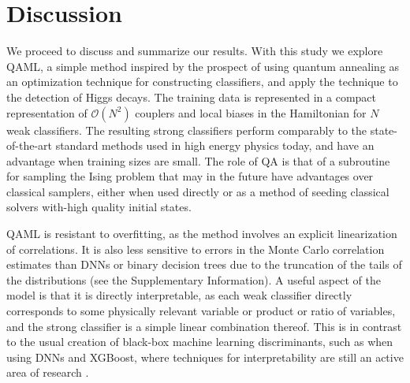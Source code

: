 \documentclass[.chapters/Higgs/.chapters/Higgs/main.tex]{subfiles}
\begin{document}
\section*{Discussion}
We proceed to discuss and summarize our results.
With this study we explore QAML, a simple method inspired by the prospect of using quantum annealing as an optimization technique for constructing classifiers, and apply the technique to the detection of Higgs decays. The training data is represented in a compact representation of $\mathcal{O}(N^2)$ couplers and local biases in the Hamiltonian for $N$ weak classifiers.
The resulting strong classifiers perform comparably to the state-of-the-art standard methods used in high energy physics today, and have an advantage when training sizes are small.  The role of QA is that of a subroutine for sampling the Ising problem that may in the future have advantages over classical samplers, either when used directly or as a method of seeding classical solvers with-high quality initial states.

QAML is resistant to overfitting, as the method involves an explicit linearization of correlations. It is also less sensitive to errors in the Monte Carlo correlation estimates than DNNs or binary decision trees due to the truncation of the tails of the distributions (see the Supplementary Information). 
A useful aspect of the model is that it is directly interpretable, as each weak classifier directly corresponds to some physically relevant variable or product or ratio of variables, and the strong classifier is a simple linear combination thereof. This is in contrast to the usual creation of black-box machine learning discriminants, such as when using DNNs and XGBoost, where techniques for interpretability are still an active area of research \cite{Chen:2016aa}. 
\end{document}
